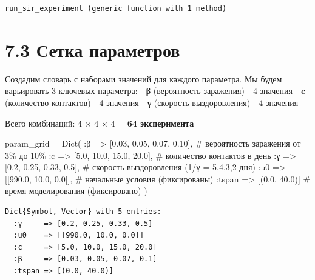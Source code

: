 \documentclass[
  12pt,
  a4paper,
  DIV=11,
  numbers=noendperiod]{scrreprt}
\newenvironment{Shaded}{\begin{snugshade}}{\end{snugshade}}
\newcommand{\CommentTok}[1]{\textcolor[rgb]{0.37,0.37,0.37}{#1}}
\newcommand{\FloatTok}[1]{\textcolor[rgb]{0.68,0.00,0.00}{#1}}
\newcommand{\FunctionTok}[1]{\textcolor[rgb]{0.28,0.35,0.67}{#1}}
\newcommand{\NormalTok}[1]{\textcolor[rgb]{0.00,0.23,0.31}{#1}}
\newcommand{\OperatorTok}[1]{\textcolor[rgb]{0.37,0.37,0.37}{#1}}
\begin{document}
\begin{verbatim}
run_sir_experiment (generic function with 1 method)
\end{verbatim}

\section{7.3 Сетка
параметров}\label{ux441ux435ux442ux43aux430-ux43fux430ux440ux430ux43cux435ux442ux440ux43eux432}

Создадим словарь с наборами значений для каждого параметра. Мы будем
варьировать 3 ключевых параметра: - \textbf{β} (вероятность заражения) -
4 значения - \textbf{c} (количество контактов) - 4 значения - \textbf{γ}
(скорость выздоровления) - 4 значения

Всего комбинаций: 4 × 4 × 4 = \textbf{64 эксперимента}

\begin{Shaded}
\begin{Highlighting}[]
\NormalTok{param\_grid }\OperatorTok{=} \FunctionTok{Dict}\NormalTok{(}
    \OperatorTok{:}\NormalTok{β }\OperatorTok{=\textgreater{}}\NormalTok{ [}\FloatTok{0.03}\NormalTok{, }\FloatTok{0.05}\NormalTok{, }\FloatTok{0.07}\NormalTok{, }\FloatTok{0.10}\NormalTok{],     }\CommentTok{\# вероятность заражения от 3\% до 10\%}
    \OperatorTok{:}\NormalTok{c }\OperatorTok{=\textgreater{}}\NormalTok{ [}\FloatTok{5.0}\NormalTok{, }\FloatTok{10.0}\NormalTok{, }\FloatTok{15.0}\NormalTok{, }\FloatTok{20.0}\NormalTok{],       }\CommentTok{\# количество контактов в день}
    \OperatorTok{:}\NormalTok{γ }\OperatorTok{=\textgreater{}}\NormalTok{ [}\FloatTok{0.2}\NormalTok{, }\FloatTok{0.25}\NormalTok{, }\FloatTok{0.33}\NormalTok{, }\FloatTok{0.5}\NormalTok{],        }\CommentTok{\# скорость выздоровления (1/γ = 5,4,3,2 дня)}
    \OperatorTok{:}\NormalTok{u0 }\OperatorTok{=\textgreater{}}\NormalTok{ [[}\FloatTok{990.0}\NormalTok{, }\FloatTok{10.0}\NormalTok{, }\FloatTok{0.0}\NormalTok{]],          }\CommentTok{\# начальные условия (фиксированы)}
    \OperatorTok{:}\NormalTok{tspan }\OperatorTok{=\textgreater{}}\NormalTok{ [(}\FloatTok{0.0}\NormalTok{, }\FloatTok{40.0}\NormalTok{)]               }\CommentTok{\# время моделирования (фиксировано)}
\NormalTok{)}
\end{Highlighting}
\end{Shaded}

\begin{verbatim}
Dict{Symbol, Vector} with 5 entries:
  :γ     => [0.2, 0.25, 0.33, 0.5]
  :u0    => [[990.0, 10.0, 0.0]]
  :c     => [5.0, 10.0, 15.0, 20.0]
  :β     => [0.03, 0.05, 0.07, 0.1]
  :tspan => [(0.0, 40.0)]
\end{verbatim}
\end{document}
